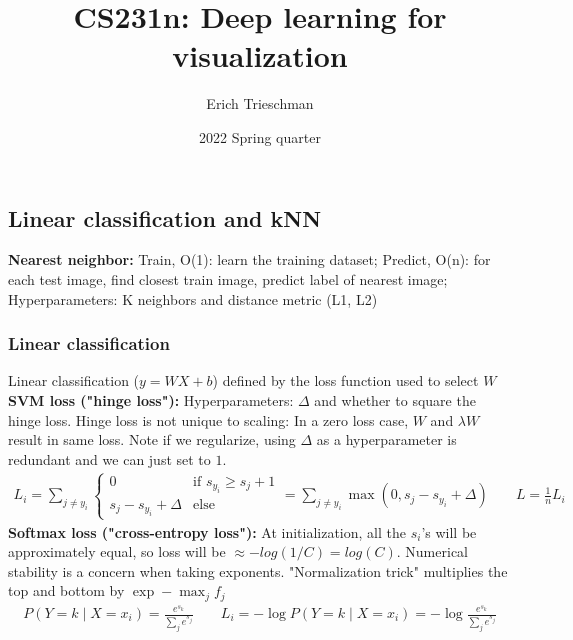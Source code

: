 \documentclass[9pt]{extarticle}
\title{CS231n: Deep learning for visualization}
\author{Erich Trieschman}
\date{2022 Spring quarter}
\begin{document}


\subsection{Linear classification and kNN}
\textbf{Nearest neighbor:} Train, O(1): learn the training dataset; Predict, O(n): for each test image, find closest train image, predict label of nearest image; Hyperparameters: K neighbors and distance metric (L1, L2)
\subsubsection{Linear classification}
Linear classification ($y = WX + b$) defined by the loss function used to select $W$\\
\textbf{SVM loss ("hinge loss"):} Hyperparameters: $\Delta$ and whether to square the hinge loss. Hinge loss is not unique to scaling: In a zero loss case, $W$ and $\lambda W$ result in same loss. Note if we regularize, using $\Delta$ as a hyperparameter is redundant and we can just set to $1$.
\begin{align*}
    L_i  = \sum_{j \neq y_i} \begin{cases}
        0 & \textrm{if } s_{y_i} \geq s_j + 1 \\
        s_j - s_{y_i} + \Delta & \textrm{else}
    \end{cases} = \sum_{j \neq y_i} \max (0, s_j - s_{y_i} + \Delta) \;\;\;\;\;\;\; L = \frac{1}{n}L_i
\end{align*}
\textbf{Softmax loss ("cross-entropy loss"):} At initialization, all the $s_i$'s will be approximately equal, so loss will be $\approx -log(1/C) = log(C)$. Numerical stability is a concern when taking exponents. "Normalization trick" multiplies the top and bottom by $\exp -\max_j f_j$
\begin{align*}
    P(Y = k \mid X = x_i) = \frac{e^{s_k}}{\sum_j e^{s_j}} \;\;\;\;\;\;\; L_i = -\log P(Y = k \mid X = x_i) = -\log \frac{e^{s_k}}{\sum_j e^{s_j}}
\end{align*}
\end{document}
